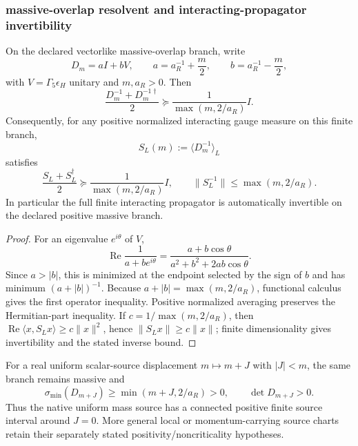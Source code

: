 \documentclass[12pt,a4paper]{article}
\begin{document}



\subsubsection{massive-overlap resolvent and interacting-propagator invertibility}
\label{p10:sec:v167-massive-overlap-resolvent}

\begin{theorem}
\label{p10:thm:v167-overlap-resolvent-accretive}
On the declared vectorlike massive-overlap branch, write
\[
 D_m=aI+bV,\qquad
 a=a_R^{-1}+\frac m2,\qquad
 b=a_R^{-1}-\frac m2,
\]
with $V=\Gamma_5\epsilon_H$ unitary and $m,a_R>0$.  Then
\[
 \boxed{
 \frac{D_m^{-1}+D_m^{-1\dagger}}2
 \succeq
 \frac{1}{\max(m,2/a_R)}I .}
\]
Consequently, for any positive normalized interacting gauge measure on this
finite branch,
\[
 S_L(m):=\langle D_m^{-1}\rangle_L
\]
satisfies
\[
 \boxed{
 \frac{S_L+S_L^\dagger}{2}
 \succeq
 \frac{1}{\max(m,2/a_R)}I,}
\qquad
 \boxed{\|S_L^{-1}\|\le \max(m,2/a_R).}
\]
In particular the full finite interacting propagator is automatically
invertible on the declared positive massive branch.
\end{theorem}
\begin{proof}
For an eigenvalue $e^{i\theta}$ of $V$,
\[
 \operatorname{Re}\frac1{a+b e^{i\theta}}
 =\frac{a+b\cos\theta}{a^2+b^2+2ab\cos\theta}.
\]
Since $a>|b|$, this is minimized at the endpoint selected by the sign of $b$
and has minimum $(a+|b|)^{-1}$.  Because
$a+|b|=\max(m,2/a_R)$, functional calculus gives the first operator
inequality.  Positive normalized averaging preserves the Hermitian-part
inequality.  If $c=1/\max(m,2/a_R)$, then
$\operatorname{Re}\langle x,S_Lx\rangle\ge c\|x\|^2$, hence
$\|S_Lx\|\ge c\|x\|$; finite dimensionality gives invertibility and the
stated inverse bound.
\end{proof}

\begin{corollary}
\label{p10:cor:v167-positive-mass-source-interval}
For a real uniform scalar-source displacement $m\mapsto m+J$ with
$|J|<m$, the same branch remains massive and
\[
 \sigma_{\min}(D_{m+J})\ge \min(m+J,2/a_R)>0,
 \qquad \det D_{m+J}>0.
\]
Thus the native uniform mass source has a connected positive finite source
interval around $J=0$.  More general local or momentum-carrying source charts
retain their separately stated positivity/noncriticality hypotheses.
\end{corollary}
\end{document}
